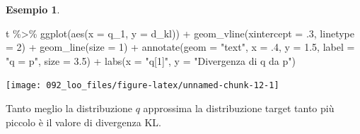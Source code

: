 \documentclass[
  10pt,
  italian,
  a4paper,
  extrafontsizes,onecolumn,openright
  ]{memoir}
\newenvironment{Shaded}{\begin{snugshade}}{\end{snugshade}}
\newcommand{\AttributeTok}[1]{\textcolor[rgb]{0.77,0.63,0.00}{#1}}
\newcommand{\DecValTok}[1]{\textcolor[rgb]{0.00,0.00,0.81}{#1}}
\newcommand{\FloatTok}[1]{\textcolor[rgb]{0.00,0.00,0.81}{#1}}
\newcommand{\FunctionTok}[1]{\textcolor[rgb]{0.00,0.00,0.00}{#1}}
\newcommand{\NormalTok}[1]{#1}
\newcommand{\SpecialCharTok}[1]{\textcolor[rgb]{0.00,0.00,0.00}{#1}}
\newcommand{\StringTok}[1]{\textcolor[rgb]{0.31,0.60,0.02}{#1}}
\theoremstyle{definition}
\theoremstyle{definition}
\newtheorem{example}{Esempio}[chapter]
\theoremstyle{definition}
\theoremstyle{definition}
\theoremstyle{remark}
\begin{document}
\begin{example}
\begin{Shaded}
\begin{Highlighting}[]
\NormalTok{t }\SpecialCharTok{\%\textgreater{}\%}
  \FunctionTok{ggplot}\NormalTok{(}\FunctionTok{aes}\NormalTok{(}\AttributeTok{x =}\NormalTok{ q\_1, }\AttributeTok{y =}\NormalTok{ d\_kl)) }\SpecialCharTok{+}
  \FunctionTok{geom\_vline}\NormalTok{(}\AttributeTok{xintercept =}\NormalTok{ .}\DecValTok{3}\NormalTok{, }\AttributeTok{linetype =} \DecValTok{2}\NormalTok{) }\SpecialCharTok{+}
  \FunctionTok{geom\_line}\NormalTok{(}\AttributeTok{size =} \DecValTok{1}\NormalTok{) }\SpecialCharTok{+}
  \FunctionTok{annotate}\NormalTok{(}\AttributeTok{geom =} \StringTok{"text"}\NormalTok{, }\AttributeTok{x =}\NormalTok{ .}\DecValTok{4}\NormalTok{, }\AttributeTok{y =} \FloatTok{1.5}\NormalTok{, }\AttributeTok{label =} \StringTok{"q = p"}\NormalTok{,}
           \AttributeTok{size =} \FloatTok{3.5}\NormalTok{) }\SpecialCharTok{+}
  \FunctionTok{labs}\NormalTok{(}\AttributeTok{x =} \StringTok{"q[1]"}\NormalTok{,}
       \AttributeTok{y =} \StringTok{"Divergenza di q da p"}\NormalTok{)}
\end{Highlighting}
\end{Shaded}

\begin{center}\texttt{[image: 092\_loo\_files/figure-latex/unnamed-chunk-12-1]} \end{center}

\noindent
Tanto meglio la distribuzione \(q\) approssima la distribuzione target tanto più piccolo è il valore di divergenza KL.
\end{example}
\end{document}
